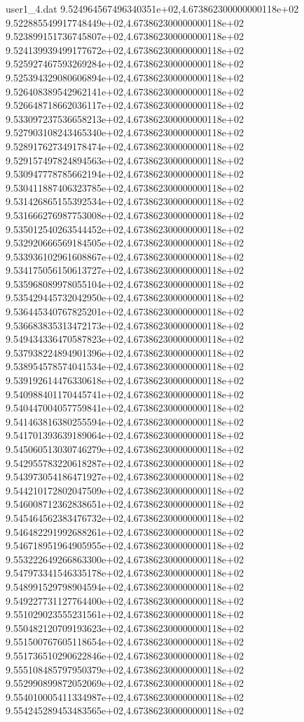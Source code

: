 \begin{filecontents}{user1_4.dat}
9.524964567496340351e+02,4.673862300000000118e+02
9.522885549917748449e+02,4.673862300000000118e+02
9.523899151736745807e+02,4.673862300000000118e+02
9.524139939499177672e+02,4.673862300000000118e+02
9.525927467593269284e+02,4.673862300000000118e+02
9.525394329080606894e+02,4.673862300000000118e+02
9.526408389542962141e+02,4.673862300000000118e+02
9.526648718662036117e+02,4.673862300000000118e+02
9.533097237536658213e+02,4.673862300000000118e+02
9.527903108243465340e+02,4.673862300000000118e+02
9.528917627349178474e+02,4.673862300000000118e+02
9.529157497824894563e+02,4.673862300000000118e+02
9.530947778785662194e+02,4.673862300000000118e+02
9.530411887406323785e+02,4.673862300000000118e+02
9.531426865155392534e+02,4.673862300000000118e+02
9.531666276987753008e+02,4.673862300000000118e+02
9.535012540263544452e+02,4.673862300000000118e+02
9.532920666569184505e+02,4.673862300000000118e+02
9.533936102961608867e+02,4.673862300000000118e+02
9.534175056150613727e+02,4.673862300000000118e+02
9.535968089978055104e+02,4.673862300000000118e+02
9.535429445732042950e+02,4.673862300000000118e+02
9.536445340767825201e+02,4.673862300000000118e+02
9.536683835313472173e+02,4.673862300000000118e+02
9.549434336470587823e+02,4.673862300000000118e+02
9.537938224894901396e+02,4.673862300000000118e+02
9.538954578574041534e+02,4.673862300000000118e+02
9.539192614476330618e+02,4.673862300000000118e+02
9.540988401170445741e+02,4.673862300000000118e+02
9.540447004057759841e+02,4.673862300000000118e+02
9.541463816380255594e+02,4.673862300000000118e+02
9.541701393639189064e+02,4.673862300000000118e+02
9.545060513030746279e+02,4.673862300000000118e+02
9.542955783220618287e+02,4.673862300000000118e+02
9.543973054186471927e+02,4.673862300000000118e+02
9.544210172802047509e+02,4.673862300000000118e+02
9.546008712362838651e+02,4.673862300000000118e+02
9.545464562383476732e+02,4.673862300000000118e+02
9.546482291992688261e+02,4.673862300000000118e+02
9.546718951964905955e+02,4.673862300000000118e+02
9.553222649266863300e+02,4.673862300000000118e+02
9.547973341546335178e+02,4.673862300000000118e+02
9.548991529798904594e+02,4.673862300000000118e+02
9.549227731127764400e+02,4.673862300000000118e+02
9.551029023555231561e+02,4.673862300000000118e+02
9.550482120709193623e+02,4.673862300000000118e+02
9.551500767605118654e+02,4.673862300000000118e+02
9.551736510290622846e+02,4.673862300000000118e+02
9.555108485797950379e+02,4.673862300000000118e+02
9.552990899872052069e+02,4.673862300000000118e+02
9.554010005411334987e+02,4.673862300000000118e+02
9.554245289453483565e+02,4.673862300000000118e+02

\end{filecontents}

